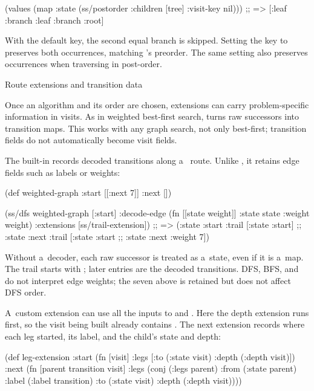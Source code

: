 (values (map :state (ss/postorder :children [tree] {:visit-key nil})))
;; => [:leaf :branch :leaf :branch :root]
\endtt

With the default key, the second equal branch is skipped. Setting the key to
 preserves both occurrences, matching 's preorder.
The same setting also preserves occurrences when traversing in post-order.

\secc[transitions] Route extensions and transition data

Once an algorithm and its order are chosen, extensions can carry
problem-specific information in visits. As in weighted best-first search,
 turns raw successors into transition maps. This works
with any graph search, not only best-first; transition fields do not
automatically become visit fields.

The built-in  records decoded transitions along a~
route. Unlike , it retains edge fields such as labels
or weights:

\begtt {}
(def weighted-graph
  {:start [[:next 7]]
   :next []})

(ss/dfs weighted-graph [:start]
        {:decode-edge (fn [[state weight]]
                        {:state state :weight weight})
         :extensions [ss/trail-extension]})
;; => ({:state :start :trail [{:state :start}]}
;;     {:state :next :trail [{:state :start}
;;                           {:state :next :weight 7}]})
\endtt

Without a~decoder, each raw successor is treated as a~state, even if it is
a~map. The trail starts with ; later entries are the
decoded transitions. DFS, BFS, and  do not interpret edge
weights; the seven above is retained but does not affect DFS order.

A~custom extension can use all the inputs to  and
. Here the depth extension runs first, so the visit being built
already contains . The next extension records where each leg
started, its label, and the child's state and depth:

\begtt {}
(def leg-extension
  {:start (fn [visit]
            {:legs [{:to (:state visit) :depth (:depth visit)}]})
   :next (fn [parent transition visit]
           {:legs (conj (:legs parent)
                        {:from (:state parent)
                         :label (:label transition)
                         :to (:state visit)
                         :depth (:depth visit)})})})

